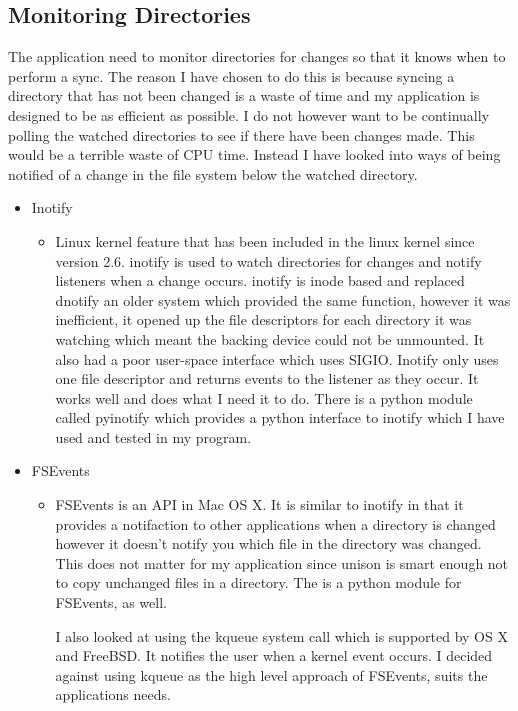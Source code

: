 \documentclass[12pt]{article}
\begin{document}
\subsection{Monitoring Directories}
The application need to monitor directories for changes
so that it knows when to perform a sync. The reason I have
chosen to do this is because syncing a directory that
has not been changed is a waste of time and my application
is designed to be as efficient as possible. I do not
however want to be continually polling the watched
directories to see if there have been changes made.
This would be a terrible waste of CPU time. Instead
I have looked into ways of being notified of a
change in the file system below the watched directory.
\begin{itemize}
    \item Inotify
        \begin{itemize}
        \item Linux kernel feature that has been
        included in the linux kernel since version 2.6.
        inotify is used to watch directories for changes
        and notify listeners when a change occurs. inotify
        is inode based and replaced dnotify an older system
        which provided the same function, however it was
        inefficient, it opened up the file descriptors for
        each directory it was watching which meant the backing
        device could not be unmounted. It also had a poor
        user-space interface which uses SIGIO. Inotify only
        uses one file descriptor and returns events to the
        listener as they occur. It works well and does
        what I need it to do. There is a python module
        called pyinotify which provides a python interface
        to inotify which I have used and tested in my program.
        \end{itemize}

    \item FSEvents
        \begin{itemize}
        \item FSEvents is an API in Mac OS X. It is similar
        to inotify in that it provides a notifaction to other
        applications when a directory is changed however
        it doesn't notify you which file in the directory
        was changed. This does not matter for my
        application since unison is smart enough not to copy
        unchanged files in a directory. The is a python module
        for FSEvents, as well. 
        
        I also looked at using the kqueue system call which is
        supported by OS X and FreeBSD. It notifies the user
        when a kernel event occurs. I decided against using
        kqueue as the high level approach of FSEvents,
        suits the applications needs.
        \end{itemize}


\end{itemize}
\end{document}
